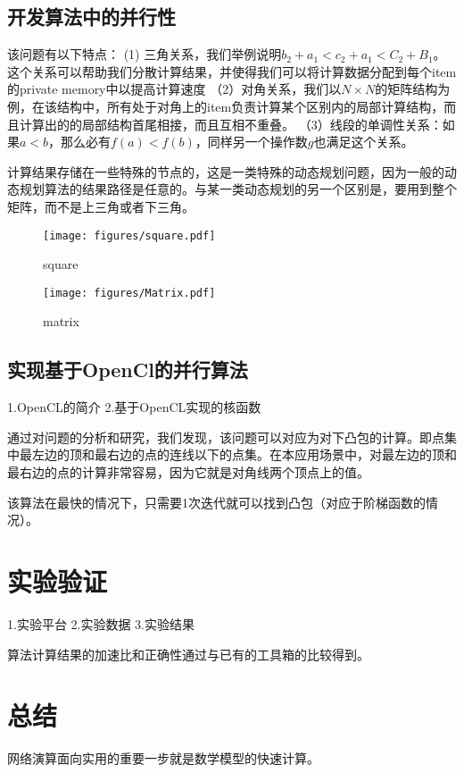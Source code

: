 \documentclass[10pt,journal]{IEEEtran}
\begin{document}
\subsection{开发算法中的并行性}
该问题有以下特点：
(1) 三角关系，我们举例说明$b_2+a_1<c_2+a_1<C_2+B_1$。这个关系可以帮助我们分散计算结果，并使得我们可以将计算数据分配到每个item的private memory中以提高计算速度
（2）对角关系，我们以$N\times N$的矩阵结构为例，在该结构中，所有处于对角上的item负责计算某个区别内的局部计算结构，而且计算出的的局部结构首尾相接，而且互相不重叠。
（3）线段的单调性关系：如果$a<b$，那么必有$f(a)<f(b)$，同样另一个操作数$g$也满足这个关系。

计算结果存储在一些特殊的节点的，这是一类特殊的动态规划问题，因为一般的动态规划算法的结果路径是任意的。与某一类动态规划的另一个区别是，要用到整个矩阵，而不是上三角或者下三角。

\begin{figure}
  \centering
  \texttt{[image: figures/square.pdf]}\\
  \caption{square}\label{square}
\end{figure}

\begin{figure}
  \centering
  \texttt{[image: figures/Matrix.pdf]}\\
  \caption{matrix}\label{matrix}
\end{figure}

\subsection{实现基于OpenCl的并行算法}
1.OpenCL的简介
2.基于OpenCL实现的核函数

通过对问题的分析和研究，我们发现，该问题可以对应为对下凸包的计算。即点集中最左边的顶和最右边的点的连线以下的点集。在本应用场景中，对最左边的顶和最右边的点的计算非常容易，因为它就是对角线两个顶点上的值。

该算法在最快的情况下，只需要1次迭代就可以找到凸包（对应于阶梯函数的情况）。

\section{实验验证}\label{experiments}
1.实验平台
2.实验数据
3.实验结果

算法计算结果的加速比和正确性通过与已有的工具箱的比较得到。

\section{总结}
网络演算面向实用的重要一步就是数学模型的快速计算。



\end{document}
